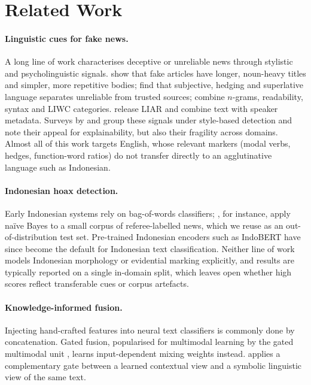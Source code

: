 \section{Related Work}
\label{sec:related}

\paragraph{Linguistic cues for fake news.}
A long line of work characterises deceptive or unreliable news through stylistic and psycholinguistic
signals. \citet{horne2017fake} show that fake articles have longer, noun-heavy titles and simpler,
more repetitive bodies; \citet{rashkin2017truth} find that subjective, hedging and superlative
language separates unreliable from trusted sources; \citet{perezrosas2018automatic} combine
$n$-grams, readability, syntax and LIWC categories. \citet{wang2017liar} release LIAR and combine
text with speaker metadata. Surveys by \citet{shu2017fake} and \citet{zhou2020survey} group these
signals under style-based detection and note their appeal for explainability, but also their fragility
across domains. Almost all of this work targets English, whose relevant markers (modal verbs, hedges,
function-word ratios) do not transfer directly to an agglutinative language such as Indonesian.

\paragraph{Indonesian hoax detection.}
Early Indonesian systems rely on bag-of-words classifiers; \citet{pratiwi2017hoax}, for instance,
apply naïve Bayes to a small corpus of referee-labelled news, which we reuse as an out-of-distribution
test set. Pre-trained Indonesian encoders such as IndoBERT \citep{wilie2020indonlu,koto2020indolem}
have since become the default for Indonesian text classification. Neither line of work models
Indonesian morphology or evidential marking explicitly, and results are typically reported on a single
in-domain split, which leaves open whether high scores reflect transferable cues or corpus artefacts.

\paragraph{Knowledge-informed fusion.}
Injecting hand-crafted features into neural text classifiers is commonly done by concatenation.
Gated fusion, popularised for multimodal learning by the gated multimodal unit
\citep{arevalo2017gated}, learns input-dependent mixing weights instead. \menet{} applies a
complementary gate between a learned contextual view and a symbolic linguistic view of the same text.


